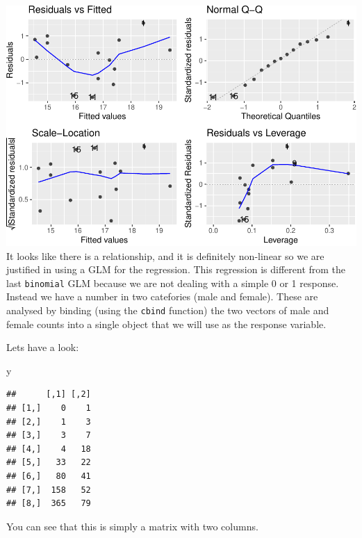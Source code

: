 \documentclass[
  a4paperpaper,
]{book}
\newenvironment{Shaded}{\begin{snugshade}}{\end{snugshade}}
\newcommand{\KeywordTok}[1]{\textcolor[rgb]{0.13,0.29,0.53}{\textbf{#1}}}
\newcommand{\NormalTok}[1]{#1}
\newcommand{\OperatorTok}[1]{\textcolor[rgb]{0.81,0.36,0.00}{\textbf{#1}}}
\newcommand{\StringTok}[1]{\textcolor[rgb]{0.31,0.60,0.02}{#1}}
\begin{document}
\includegraphics{BB852_files/figure-latex/unnamed-chunk-251-1.pdf}
It looks like there is a relationship, and it is definitely non-linear so we are justified in using a GLM for the regression.
This regression is different from the last \texttt{binomial} GLM because we are not dealing with a simple 0 or 1 response. Instead we have a number in two catefories (male and female). These are analysed by binding (using the \texttt{cbind} function) the two vectors of male and female counts into a single object that we will use as the response variable.

\begin{Shaded}
\end{Shaded}

Lets have a look:

\begin{Shaded}
\begin{Highlighting}[]
\NormalTok{y}
\end{Highlighting}
\end{Shaded}

\begin{verbatim}
##      [,1] [,2]
## [1,]    0    1
## [2,]    1    3
## [3,]    3    7
## [4,]    4   18
## [5,]   33   22
## [6,]   80   41
## [7,]  158   52
## [8,]  365   79
\end{verbatim}

You can see that this is simply a matrix with two columns.
\end{document}
